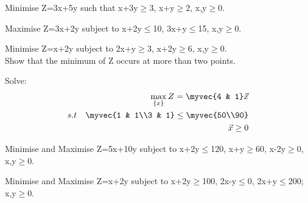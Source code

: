 \solution

\item Minimise Z=3x+5y
such that x+3y$\geq$3, x+y$\geq$2, x,y$\geq$0.\\
\item Maximise Z=3x+2y
subject to x+2y$\leq$10, 3x+y$\leq$15, x,y$\geq$0.\\
\solution

\item Minimise Z=x+2y
subject to 2x+y$\geq$3, x+2y$\geq$6, x,y$\geq$0.\\
Show that the minimum of Z occurs at more than two points.\\
\solution

\item Solve:
\begin{align}
    \max_{\{x\}} Z=\myvec{4 & 1}\vec{x}\label{eq:solutions/4/38/eq:1}\\
    s.t\quad \myvec{1 & 1\\3 & 1} \leq \myvec{50\\90}\label{eq:solutions/4/38/eq:2}\\
    \Vec{x}\geq 0 \label{eq:solutions/4/38/eq:3}
\end{align}
\solution

\item Minimise and Maximise Z=5x+10y
subject to x+2y$\leq$120, x+y$\geq$60, x-2y$\geq$0, x,y$\geq$0.\\
\solution

\item Minimise and Maximise Z=x+2y
subject to x+2y$\geq$100, 2x-y$\leq$0, 2x+y$\leq$200; x,y$\geq$0.\\
\solution

%
